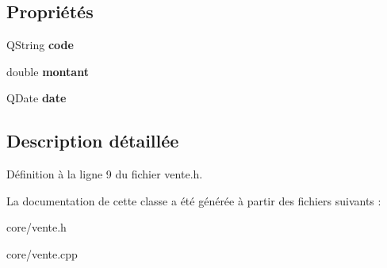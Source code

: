 \subsection*{Propriétés}
\begin{DoxyCompactItemize}
\item 
\hypertarget{class_core_1_1_vente_abb1c7950bc7264a42cd4b7638218bd6d}{
QString {\bfseries code}}
\label{d9/d66/class_core_1_1_vente_abb1c7950bc7264a42cd4b7638218bd6d}

\item 
\hypertarget{class_core_1_1_vente_a01cf2b6d838af0908cd842651bc28cca}{
double {\bfseries montant}}
\label{d9/d66/class_core_1_1_vente_a01cf2b6d838af0908cd842651bc28cca}

\item 
\hypertarget{class_core_1_1_vente_a131c8a5328eeeb45a9274c27d6d573f9}{
QDate {\bfseries date}}
\label{d9/d66/class_core_1_1_vente_a131c8a5328eeeb45a9274c27d6d573f9}

\end{DoxyCompactItemize}


\subsection{Description détaillée}


Définition à la ligne 9 du fichier vente.h.



La documentation de cette classe a été générée à partir des fichiers suivants :\begin{DoxyCompactItemize}
\item 
core/vente.h\item 
core/vente.cpp\end{DoxyCompactItemize}

